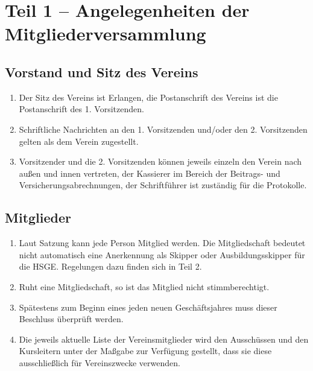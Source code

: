 \documentclass[10pt, twocolumn, parskip=half]{scrartcl}
\begin{document}
	



\section*{Teil 1 – Angelegenheiten der Mitgliederversammlung}
\subsection{Vorstand und Sitz des Vereins}
\begin{enumerate}[noitemsep]
	\item Der Sitz des Vereins ist Erlangen, die Postanschrift des Vereins ist die Postanschrift des 1. Vorsitzenden.
	\item Schriftliche Nachrichten an den 1. Vorsitzenden und/oder den 2. Vorsitzenden gelten als dem Verein zugestellt.
	\item Vorsitzender und die 2. Vorsitzenden können jeweils einzeln den Verein nach außen und innen vertreten, der Kassierer im Bereich der Beitrags- und Versicherungsabrechnungen, der Schriftführer ist zuständig für die Protokolle.
\end{enumerate}

\subsection{Mitglieder}
\begin{enumerate}[noitemsep]
	\item Laut Satzung kann jede Person Mitglied werden. Die Mitgliedschaft bedeutet nicht automatisch eine Anerkennung als Skipper oder Ausbildungsskipper für die HSGE. Regelungen dazu finden sich in Teil 2.
	\item Ruht eine Mitgliedschaft, so ist das Mitglied nicht stimmberechtigt.
	\item Spätestens zum Beginn eines jeden neuen Geschäftsjahres muss dieser Beschluss überprüft werden.
	\item Die jeweils aktuelle Liste der Vereinsmitglieder wird den Ausschüssen und den Kursleitern unter der Maßgabe zur Verfügung gestellt, dass sie diese ausschließlich für Vereinszwecke
	verwenden.
\end{enumerate}
\end{document}
